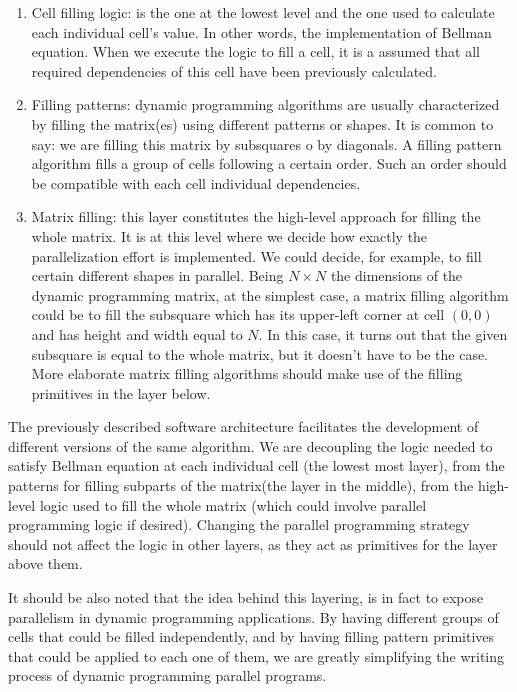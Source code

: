 \documentclass[journal]{IEEEtran}
\begin{document}
\begin{enumerate}
    \item Cell filling logic: is the one at the lowest level and the one used to calculate each individual cell's value. In other words, the implementation of Bellman equation. When we execute the logic to fill a cell, it is a assumed that all required dependencies of this cell have been previously calculated.
    \item Filling patterns: dynamic programming algorithms are usually characterized by filling the matrix(es) using different patterns or shapes. It is common to say: we are filling this matrix by subsquares o by diagonals. A filling pattern algorithm fills a group of cells following a certain order. Such an order should be compatible with each cell individual dependencies.
    \item Matrix filling: this layer constitutes the high-level approach for filling the whole matrix. It is at this level where we decide how exactly the parallelization effort is implemented. We could decide, for example, to fill certain different shapes in parallel. Being $N \times N$ the dimensions of the dynamic programming matrix, at the simplest case, a matrix filling algorithm could be to fill the subsquare which has its upper-left corner at cell $(0,0)$ and has height and width equal to $N$. In this case, it turns out that the given subsquare is equal to the whole matrix, but it doesn't have to be the case. More elaborate matrix filling algorithms should make use of the filling primitives in the layer below. 
\end{enumerate}

The previously described software architecture facilitates the development of different versions of the same algorithm. We are decoupling the logic needed to satisfy Bellman equation at each individual cell (the lowest most layer), from the patterns for filling subparts of the matrix(the layer in the middle), from the high-level logic used to fill the whole matrix (which could involve parallel programming logic if desired). Changing the parallel programming strategy should not affect the logic in other layers, as they act as primitives for the layer above them.

It should be also noted that the idea behind this layering, is in fact to expose parallelism in dynamic programming applications. By having different groups of cells that could be filled independently, and by having filling pattern primitives that could be applied to each one of them, we are greatly simplifying the writing process of dynamic programming parallel programs.
\end{document}
